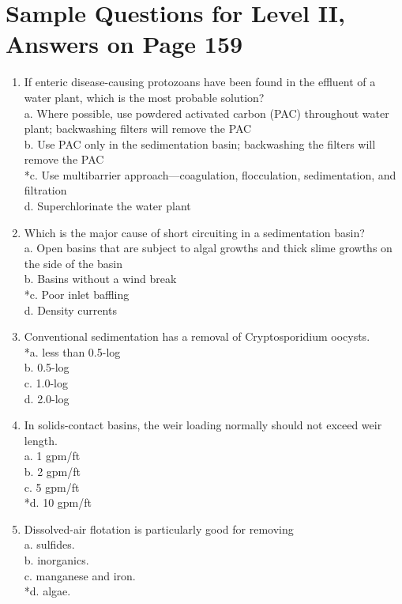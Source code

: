 \section{Sample Questions for Level II, Answers on Page 159}
\begin{enumerate}[label=TII-\arabic*]
\item If enteric disease-causing protozoans have been found in the effluent of a water plant, which is the most probable solution?\\
a. Where possible, use powdered activated carbon (PAC) throughout water plant; backwashing filters will remove the PAC\\
b. Use PAC only in the sedimentation basin; backwashing the filters will remove the PAC\\
*c. Use multibarrier approach—coagulation, flocculation, sedimentation, and filtration\\
d. Superchlorinate the water plant \\
\item Which is the major cause of short circuiting in a sedimentation basin?\\
a. Open basins that are subject to algal growths and thick slime growths on the side of the basin\\
b. Basins without a wind break\\
*c. Poor inlet baffling\\
d. Density currents\\
\item Conventional sedimentation has a removal of Cryptosporidium oocysts.\\
*a. less than 0.5-log\\
b. 0.5-log\\
c. 1.0-log\\
d. 2.0-log\\
\item In solids-contact basins, the weir loading normally should not exceed weir length.\\
a. 1 gpm/ft\\
b. 2 gpm/ft\\
c. 5 gpm/ft\\
*d. 10 gpm/ft\\
\item Dissolved-air flotation is particularly good for removing\\
a. sulfides.\\
b. inorganics.\\
c. manganese and iron.\\
*d. algae.\\
\end{enumerate}
